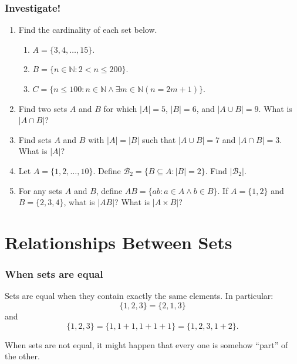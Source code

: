 \documentclass[11pt, compress]{beamer}
\newcommand{\N}{\mathbb N}
\newcommand{\st}{:}
\begin{document}
\begin{frame}
\frametitle{Investigate!}
 \begin{enumerate}
\item{} Find the cardinality of each set below.\begin{enumerate}
\item{} \(A = \{3,4,\ldots, 15\}\).

\item{} \(B = \{n \in \N \st 2 \lt n \le 200\}\).

\item{} \(C = \{n \le 100 \st n \in \N \wedge \exists m \in \N (n = 2m+1)\}\).
\end{enumerate}



\item{} Find two sets \(A\) and \(B\) for which \(|A| = 5\), \(|B| = 6\), and \(|A\cup B| = 9\). What is \(|A \cap B|\)?


\item{} Find sets \(A\) and \(B\) with \(|A| = |B|\) such that \(|A\cup B| = 7\) and \(|A \cap B| = 3\). What is \(|A|\)?


\item{} Let \(A = \{1,2,\ldots, 10\}\). Define \(\mathcal{B}_2 = \{B \subseteq A \st |B| = 2\}\). Find \(|\mathcal{B}_2|\).


\item{} For any sets \(A\) and \(B\), define \(AB = \{ab \st a\in A \wedge b \in B\}\). If \(A = \{1,2\}\) and \(B = \{2,3,4\}\), what is \(|AB|\)? What is \(|A \times B|\)?
\end{enumerate}

\end{frame}
 


\section{Relationships Between Sets}
\begin{frame}
\frametitle{When sets are equal}
 Sets are equal when they contain exactly the same elements.  In particular:%
\begin{equation*}
\{1,2,3\} = \{2,1,3\}
\end{equation*}
and%
\begin{equation*}
\{1,2,3\} = \{1, 1+1, 1+1+1\} = \{1, 2, 3, 1+2\}.
\end{equation*}

 
\pause \vfill 

When sets are not equal, it might happen that every one is somehow ``part'' of the other.
\end{frame}
 
\end{document}
